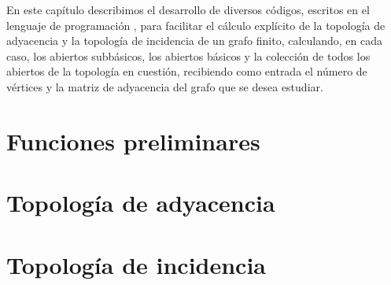 En este capítulo describimos el desarrollo de diversos códigos, escritos en el lenguaje de programación \Cpp{}, para facilitar el cálculo explícito de la topología de adyacencia y la topología de incidencia de un grafo finito, calculando, en cada caso, los abiertos subbásicos, los abiertos básicos y la colección de todos los abiertos de la topología en cuestión, recibiendo como entrada el número de vértices y la matriz de adyacencia del grafo que se desea estudiar. 
\section{Funciones preliminares}\label{sec:funciones_preliminares}

\section{Topología de adyacencia}\label{sec:adyacencia_computacional}
\section{Topología de incidencia}\label{sec:incidencia_computacional}
